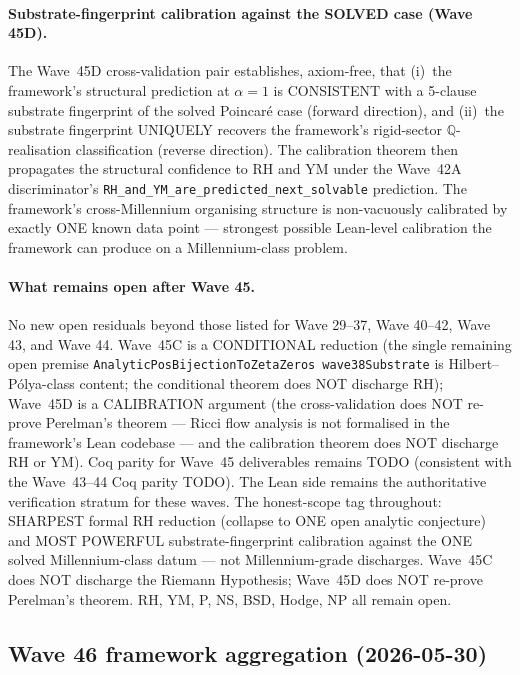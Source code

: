 \paragraph{Substrate-fingerprint calibration against the SOLVED
case (Wave 45D).}
The Wave~45D cross-validation pair establishes, axiom-free, that
(i)~the framework's structural prediction at $\alpha = 1$ is
CONSISTENT with a 5-clause substrate fingerprint of the solved
Poincar\'e case (forward direction), and (ii)~the substrate
fingerprint UNIQUELY recovers the framework's rigid-sector
$\mathbb{Q}$-realisation classification (reverse direction). The
calibration theorem then propagates the structural confidence to
RH and YM under the Wave~42A discriminator's
\texttt{RH\_and\_YM\_are\_predicted\_next\_solvable} prediction.
The framework's cross-Millennium organising structure is
non-vacuously calibrated by exactly ONE known data point ---
strongest possible Lean-level calibration the framework can
produce on a Millennium-class problem.

\paragraph{What remains open after Wave 45.} No new open residuals
beyond those listed for Wave 29--37, Wave 40--42, Wave 43, and
Wave 44. Wave~45C is a CONDITIONAL reduction (the single
remaining open premise \texttt{AnalyticPosBijectionToZetaZeros
wave38Substrate} is Hilbert--P\'olya-class content; the
conditional theorem does NOT discharge RH); Wave~45D is a
CALIBRATION argument (the cross-validation does NOT re-prove
Perelman's theorem --- Ricci flow analysis is not formalised
in the framework's Lean codebase --- and the calibration theorem
does NOT discharge RH or YM). Coq parity for Wave~45 deliverables
remains TODO (consistent with the Wave~43--44 Coq parity TODO).
The Lean side remains the authoritative verification stratum
for these waves. The honest-scope tag throughout: SHARPEST formal
RH reduction (collapse to ONE open analytic conjecture) and
MOST POWERFUL substrate-fingerprint calibration against the ONE
solved Millennium-class datum --- not Millennium-grade discharges.
Wave~45C does NOT discharge the Riemann Hypothesis; Wave~45D
does NOT re-prove Perelman's theorem. RH, YM, P, NS, BSD, Hodge,
NP all remain open.

\subsection{Wave 46 framework aggregation (2026-05-30)}
\label{subsec:wave46-aggregation}

